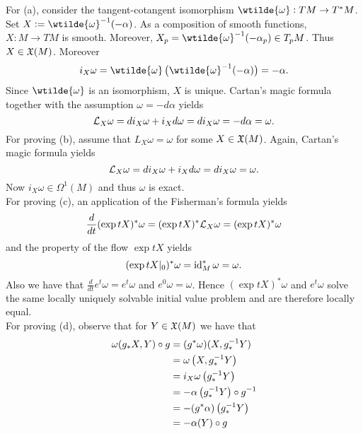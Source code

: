 \begin{solution}
	For (a), consider the tangent-cotangent isomorphism $\wtilde{\omega} : TM \to T^*M$. Set $X := \wtilde{\omega}^{-1}(-\alpha)$. As a composition of smooth functions, $X : M \to TM$ is smooth. Moreover, $X_p = \wtilde{\omega}^{-1}(-\alpha_p) \in T_pM$. Thus $X \in \mathfrak{X}(M)$. Moreover 
	\begin{equation*}
		i_X \omega = \wtilde{\omega}\del[1]{\wtilde{\omega}^{-1}(-\alpha)} = - \alpha.  
	\end{equation*}
	Since $\wtilde{\omega}$ is an isomorphism, $X$ is unique. Cartan's magic formula together with the assumption $\omega = -d\alpha$ yields
	\begin{equation*}
		\mathcal{L}_X \omega = di_X\omega + i_Xd\omega = di_X \omega = -d\alpha = \omega.
	\end{equation*}
	For proving (b), assume that $L_X \omega = \omega$ for some $X \in \mathfrak{X}(M)$. Again, Cartan's magic formula yields
	\begin{equation*}
		\mathcal{L}_X\omega = di_X\omega + i_Xd\omega = di_X\omega = \omega.
	\end{equation*}
	Now $i_X\omega \in \Omega^1(M)$ and thus $\omega$ is exact.\\
	For proving (c), an application of the Fisherman's formula yields 
	\begin{equation*}
		\frac{d}{dt} (\exp tX)^* \omega = (\exp tX)^* \mathcal{L}_X \omega = (\exp tX)^* \omega
	\end{equation*}
	\noindent and the property of the flow $\exp tX$ yields
	\begin{equation*}
		(\exp tX\vert_0)^*\omega = \operatorname{id}_M^* \omega = \omega.
	\end{equation*}
	Also we have that $\frac{d}{dt}e^t\omega = e^t\omega$ and $e^0\omega = \omega$. Hence $(\exp tX)^* \omega$ and $e^t\omega$ solve the same locally uniquely solvable initial value problem and are therefore locally equal.\\
	For proving (d), observe that for $Y \in \mathfrak{X}(M)$ we have that
	\begin{align*}
		\omega(g_*X,Y) \circ g &= (g^*\omega)(X,g_*^{-1}Y)\\
		&= \omega\del[1]{X,g_*^{-1}Y}\\
		&= i_X\omega\del[1]{g_*^{-1}Y}\\
		&= -\alpha\del[1]{g_*^{-1}Y} \circ g^{-1}\\
		&= -(g^*\alpha)\del[1]{g_*^{-1}Y}\\
		&= -\alpha(Y) \circ g\\

\end{align*}
\end{solution}
